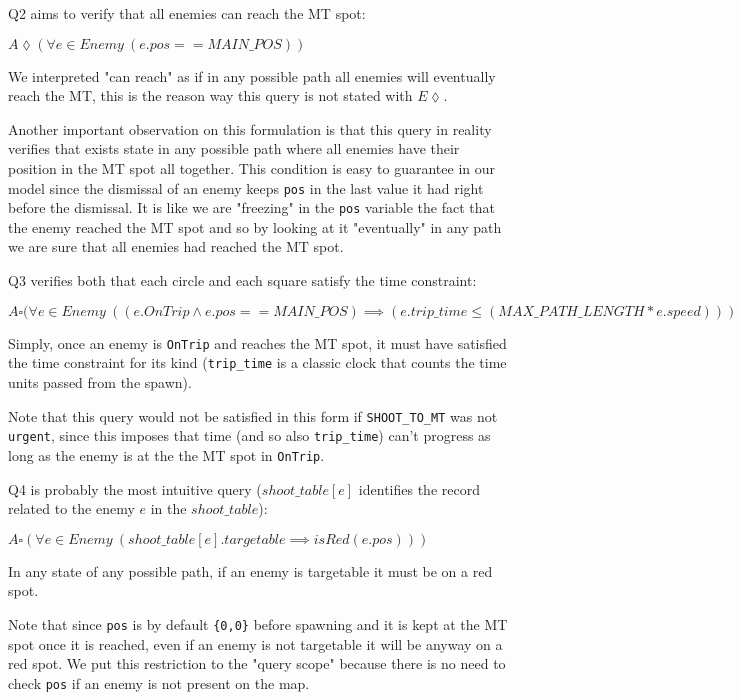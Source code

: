 \documentclass[
10pt, %
a4paper, %
oneside, %
headinclude,footinclude, %
BCOR5mm, %
]{scrartcl}
\begin{document}
				Q2 aims to verify that all enemies can reach the MT spot:
				\begin{center}
					$A\lozenge(\forall e \in Enemy\ (e.pos==MAIN\_POS))$
				\end{center}
				We interpreted "can reach" as if in any possible path all enemies will eventually reach the MT, this is the reason way this query is not stated with $E\lozenge$.
				
				Another important observation on this formulation is that this query in reality verifies that exists state in any possible path where all enemies have their position in the MT spot all together. This condition is easy to guarantee in our model since the dismissal of an enemy keeps \texttt{pos} in the last value it had right before the dismissal. It is like we are "freezing" in the \texttt{pos} variable the fact that the enemy reached the MT spot and so by looking at it "eventually" in any path we are sure that all enemies had reached the MT spot.
				
				Q3 verifies both that each circle and each square satisfy the time constraint:
				\begin{center}
					$A\square(\forall e \in Enemy\ ((e.OnTrip \wedge e.pos==MAIN\_POS) \implies (e.trip\_time\leq(MAX\_PATH\_LENGTH*e.speed)))$
				\end{center}
				Simply, once an enemy is \texttt{OnTrip} and reaches the MT spot, it must have satisfied the time constraint for its kind (\texttt{trip\_time} is a classic clock that counts the time units passed from the spawn).
				
				Note that this query would not be satisfied in this form if \texttt{SHOOT\_TO\_MT} was not \texttt{urgent}, since this imposes that time (and so also \texttt{trip\_time}) can't progress as long as the enemy is at the the MT spot in \texttt{OnTrip}.
				
				Q4 is probably the most intuitive query ($shoot\_table[e]$ identifies the record related to the enemy $e$ in the $shoot\_table$):
				\begin{center}
					$A\square(\forall e \in Enemy\ (shoot\_table[e].targetable \implies isRed(e.pos)))$
				\end{center}
				In any state of any possible path, if an enemy is targetable it must be on a red spot.
				
				Note that since \texttt{pos} is by default \texttt{\{0,0\}} before spawning and it is kept at the MT spot once it is reached, even if an enemy is not targetable it will be anyway on a red spot. We put this restriction to the "query scope" because there is no need to check \texttt{pos} if an enemy is not present on the map. 
\end{document}
